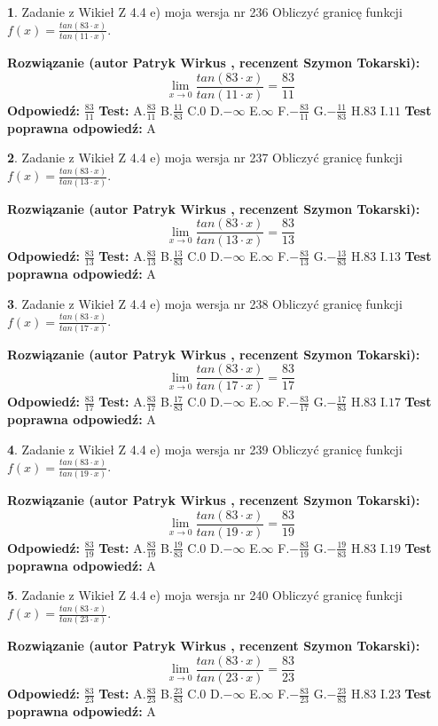 \documentclass[12pt, a4paper]{article}
\theoremstyle{definition} %
\newtheorem{zad}{}
\newcommand{\zadStart}[1]{\begin{zad}#1\newline}
\newcommand{\zadStop}{\end{zad}}
\newcommand{\rozwStart}[2]{\noindent \textbf{Rozwiązanie (autor #1 , recenzent #2): }\newline}
\newcommand{\rozwStop}{\newline}
\newcommand{\odpStart}{\noindent \textbf{Odpowiedź:}\newline}
\newcommand{\odpStop}{\newline}
\newcommand{\testStart}{\noindent \textbf{Test:}\newline}
\newcommand{\testStop}{\newline}
\newcommand{\kluczStart}{\noindent \textbf{Test poprawna odpowiedź:}\newline}
\newcommand{\kluczStop}{\newline}
\begin{document}
\zadStart{Zadanie z Wikieł Z 4.4 e) moja wersja nr 236}
Obliczyć granicę funkcji $f(x)=\frac{tan(83\cdot x)}{tan(11\cdot x)}$.
\zadStop
\rozwStart{Patryk Wirkus}{Szymon Tokarski}
$$\lim\limits_{x\to 0}\frac{tan(83\cdot x)}{tan(11\cdot x)}=
\frac{83}{11}$$
\rozwStop
\odpStart
$\frac{83}{11}$
\odpStop
\testStart
A.$\frac{83}{11}$
B.$\frac{11}{83}$
C.$0$
D.$-\infty$
E.$\infty$
F.$-\frac{83}{11}$
G.$-\frac{11}{83}$
H.$83$
I.$11$
\testStop
\kluczStart
A
\kluczStop



\zadStart{Zadanie z Wikieł Z 4.4 e) moja wersja nr 237}
Obliczyć granicę funkcji $f(x)=\frac{tan(83\cdot x)}{tan(13\cdot x)}$.
\zadStop
\rozwStart{Patryk Wirkus}{Szymon Tokarski}
$$\lim\limits_{x\to 0}\frac{tan(83\cdot x)}{tan(13\cdot x)}=
\frac{83}{13}$$
\rozwStop
\odpStart
$\frac{83}{13}$
\odpStop
\testStart
A.$\frac{83}{13}$
B.$\frac{13}{83}$
C.$0$
D.$-\infty$
E.$\infty$
F.$-\frac{83}{13}$
G.$-\frac{13}{83}$
H.$83$
I.$13$
\testStop
\kluczStart
A
\kluczStop



\zadStart{Zadanie z Wikieł Z 4.4 e) moja wersja nr 238}
Obliczyć granicę funkcji $f(x)=\frac{tan(83\cdot x)}{tan(17\cdot x)}$.
\zadStop
\rozwStart{Patryk Wirkus}{Szymon Tokarski}
$$\lim\limits_{x\to 0}\frac{tan(83\cdot x)}{tan(17\cdot x)}=
\frac{83}{17}$$
\rozwStop
\odpStart
$\frac{83}{17}$
\odpStop
\testStart
A.$\frac{83}{17}$
B.$\frac{17}{83}$
C.$0$
D.$-\infty$
E.$\infty$
F.$-\frac{83}{17}$
G.$-\frac{17}{83}$
H.$83$
I.$17$
\testStop
\kluczStart
A
\kluczStop



\zadStart{Zadanie z Wikieł Z 4.4 e) moja wersja nr 239}
Obliczyć granicę funkcji $f(x)=\frac{tan(83\cdot x)}{tan(19\cdot x)}$.
\zadStop
\rozwStart{Patryk Wirkus}{Szymon Tokarski}
$$\lim\limits_{x\to 0}\frac{tan(83\cdot x)}{tan(19\cdot x)}=
\frac{83}{19}$$
\rozwStop
\odpStart
$\frac{83}{19}$
\odpStop
\testStart
A.$\frac{83}{19}$
B.$\frac{19}{83}$
C.$0$
D.$-\infty$
E.$\infty$
F.$-\frac{83}{19}$
G.$-\frac{19}{83}$
H.$83$
I.$19$
\testStop
\kluczStart
A
\kluczStop



\zadStart{Zadanie z Wikieł Z 4.4 e) moja wersja nr 240}
Obliczyć granicę funkcji $f(x)=\frac{tan(83\cdot x)}{tan(23\cdot x)}$.
\zadStop
\rozwStart{Patryk Wirkus}{Szymon Tokarski}
$$\lim\limits_{x\to 0}\frac{tan(83\cdot x)}{tan(23\cdot x)}=
\frac{83}{23}$$
\rozwStop
\odpStart
$\frac{83}{23}$
\odpStop
\testStart
A.$\frac{83}{23}$
B.$\frac{23}{83}$
C.$0$
D.$-\infty$
E.$\infty$
F.$-\frac{83}{23}$
G.$-\frac{23}{83}$
H.$83$
I.$23$
\testStop
\kluczStart
A
\kluczStop
\end{document}
